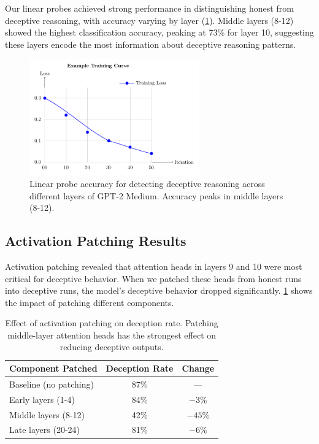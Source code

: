 \documentclass[midterm]{sparreport}
\begin{document}
Our linear probes achieved strong performance in distinguishing honest from deceptive reasoning, with accuracy varying by layer (\cref{fig:example}). Middle layers (8-12) showed the highest classification accuracy, peaking at 73\% for layer 10, suggesting these layers encode the most information about deceptive reasoning patterns.

\begin{figure}[htbp]
  \centering
  \includegraphics[width=0.65\textwidth]{figures/example-figure.pdf}
  \caption{Linear probe accuracy for detecting deceptive reasoning across different layers of GPT-2 Medium. Accuracy peaks in middle layers (8-12).}
  \label{fig:example}
\end{figure}

\subsection{Activation Patching Results}

Activation patching revealed that attention heads in layers 9 and 10 were most critical for deceptive behavior. When we patched these heads from honest runs into deceptive runs, the model's deceptive behavior dropped significantly. \cref{tab:patching} shows the impact of patching different components.

\begin{table}[htbp]
  \centering
  \caption{Effect of activation patching on deception rate. Patching middle-layer attention heads has the strongest effect on reducing deceptive outputs.}
  \label{tab:patching}
  \begin{tabular}{lcc}
    \toprule
    Component Patched & Deception Rate & Change \\
    \midrule
    Baseline (no patching) & 87\% & --- \\
    Early layers (1-4) & 84\% & $-3\%$ \\
    Middle layers (8-12) & 42\% & $-45\%$ \\
    Late layers (20-24) & 81\% & $-6\%$ \\
    \bottomrule
  \end{tabular}
\end{table}
\end{document}
